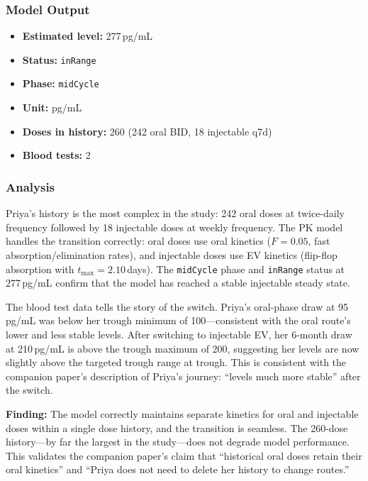 \documentclass[11pt,a4paper]{article}
\newcommand{\code}[1]{\texttt{\small #1}}
\begin{document}
\subsubsection{Model Output}

\begin{itemize}[nosep,leftmargin=1.4em]
\item \textbf{Estimated level:} 277\,pg/mL
\item \textbf{Status:} \code{inRange}
\item \textbf{Phase:} \code{midCycle}
\item \textbf{Unit:} pg/mL
\item \textbf{Doses in history:} 260 (242 oral BID, 18 injectable q7d)
\item \textbf{Blood tests:} 2
\end{itemize}

\subsubsection{Analysis}

Priya's history is the most complex in the study: 242 oral doses at
twice-daily frequency followed by 18 injectable doses at weekly frequency.
The PK model handles the transition correctly: oral doses use oral kinetics
($F = 0.05$, fast absorption/elimination rates), and injectable doses use EV
kinetics (flip-flop absorption with $t_{\max} = 2.10$\,days). The
\code{midCycle} phase and \code{inRange} status at 277\,pg/mL confirm that
the model has reached a stable injectable steady state.

The blood test data tells the story of the switch. Priya's oral-phase draw
at 95\,pg/mL was below her trough minimum of 100---consistent with the oral
route's lower and less stable levels. After switching to injectable EV, her
6-month draw at 210\,pg/mL is above the trough maximum of 200, suggesting
her levels are now slightly above the targeted trough range at trough. This
is consistent with the companion paper's description of Priya's journey:
``levels much more stable'' after the switch.

\textbf{Finding:} The model correctly maintains separate kinetics for oral
and injectable doses within a single dose history, and the transition is
seamless. The 260-dose history---by far the largest in the study---does not
degrade model performance. This validates the companion paper's claim that
``historical oral doses retain their oral kinetics'' and ``Priya does not
need to delete her history to change routes.''
\end{document}
